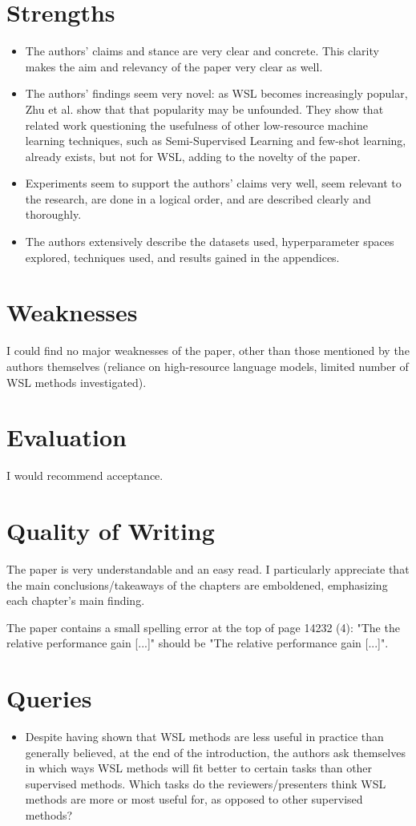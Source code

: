 \documentclass{IEEEtran}
\begin{document}
\section{Strengths}
\begin{itemize}
    \item The authors' claims and stance are very clear and concrete. This clarity makes the aim and relevancy of the paper very clear as well.
    \item The authors' findings seem very novel: as WSL becomes increasingly popular, Zhu et al. show that that popularity may be unfounded. They show that related work questioning the usefulness of other low-resource machine learning techniques, such as Semi-Supervised Learning and few-shot learning, already exists, but not for WSL, adding to the novelty of the paper. 
    \item Experiments seem to support the authors' claims very well, seem relevant to the research, are done in a logical order, and are described clearly and thoroughly.
    \item The authors extensively describe the datasets used, hyperparameter spaces explored, techniques used, and results gained in the appendices.
\end{itemize}

\section{Weaknesses}
I could find no major weaknesses of the paper, other than those mentioned by the authors themselves (reliance on high-resource language models, limited number of WSL methods investigated).

\section{Evaluation}
I would recommend acceptance.

\section{Quality of Writing}
The paper is very understandable and an easy read.
I particularly appreciate that the main conclusions/takeaways of the chapters are emboldened, emphasizing each chapter's main finding.

The paper contains a small spelling error at the top of page 14232 (4): "The the relative performance gain [...]" should be "The relative performance gain [...]".

\section{Queries}
\begin{itemize}
    \item Despite having shown that WSL methods are less useful in practice than generally believed, at the end of the introduction, the authors ask themselves in which ways WSL methods will fit better to certain tasks than other supervised methods. Which tasks do the reviewers/presenters think WSL methods are more or most useful for, as opposed to other supervised methods?
\end{itemize}
\end{document}
